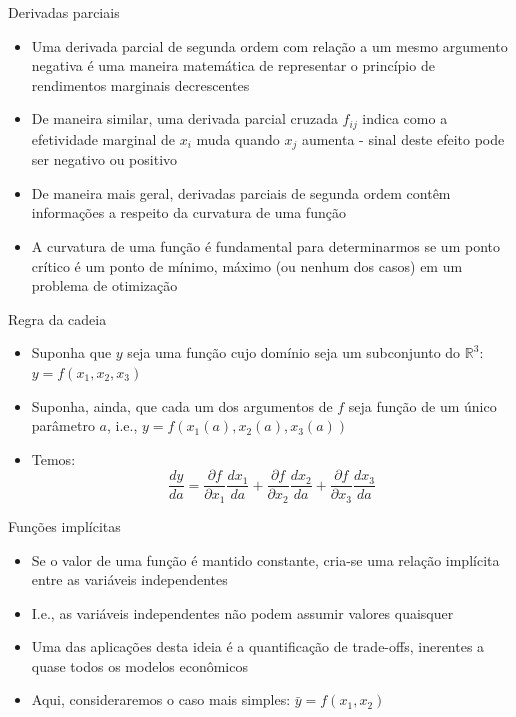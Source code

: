 \documentclass[10pt]{beamer}
\begin{document}
\begin{frame}
    {Derivadas parciais}
    \begin{itemize}
        \item Uma derivada parcial de segunda ordem com relação a um mesmo argumento negativa é uma maneira matemática de representar o princípio de rendimentos marginais decrescentes\bigskip
        \item De maneira similar, uma derivada parcial cruzada $f_{ij}$ indica como a efetividade marginal de $x_i$ muda quando $x_j$ aumenta - sinal deste efeito pode ser negativo ou positivo\bigskip
        \item De maneira mais geral, derivadas parciais de segunda ordem contêm informações a respeito da curvatura de uma função\bigskip
        \item A curvatura de uma função é fundamental para determinarmos se um ponto crítico é um ponto de mínimo, máximo (ou nenhum dos casos) em um problema de otimização
    \end{itemize}
\end{frame}

\begin{frame}
    {Regra da cadeia}
    \begin{itemize}
        \item Suponha que $y$ seja uma função cujo domínio seja um subconjunto do $\mathbb{R}^3$: $y = f(x_1, x_2, x_3)$\bigskip
        \item Suponha, ainda, que cada um dos argumentos de $f$ seja função de um único parâmetro $a$, i.e., $y = f(x_1(a),x_2(a),x_3(a))$\bigskip
        \item Temos:
        \[
          \frac{d y}{d a} = \frac{\partial f}{\partial x_1}\frac{d x_1}{d a} +   \frac{\partial f}{\partial x_2}\frac{d x_2}{d a} + \frac{\partial f}{\partial x_3}\frac{d x_3}{d a}
        \]
    \end{itemize}
\end{frame}


\begin{frame}
    {Funções implícitas}
    \begin{itemize}
        \item Se o valor de uma função é mantido constante, cria-se uma relação implícita entre as variáveis independentes\bigskip
        \item I.e., as variáveis independentes não podem assumir valores quaisquer\bigskip
        \item Uma das aplicações desta ideia é a quantificação de trade-offs, inerentes a quase todos os modelos econômicos\bigskip
        \item Aqui, consideraremos o caso mais simples: $\bar{y} = f(x_1, x_2)$
    \end{itemize}
\end{frame}
\end{document}
